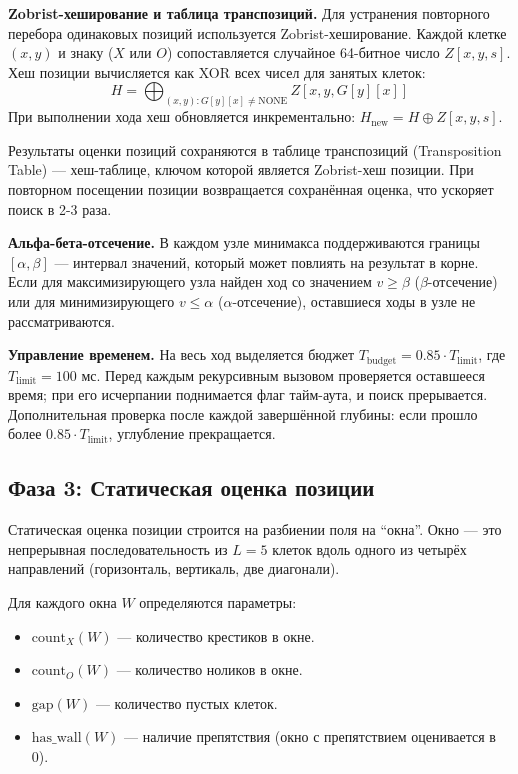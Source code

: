 \documentclass[a4paper,14pt]{extreport}
\begin{document}
\textbf{Zobrist-хеширование и таблица транспозиций.} Для устранения повторного перебора одинаковых позиций используется Zobrist-хеширование. Каждой клетке $(x, y)$ и знаку ($X$ или $O$) сопоставляется случайное 64-битное число $Z[x, y, s]$. Хеш позиции вычисляется как XOR всех чисел для занятых клеток:
\[
H = \bigoplus_{(x,y): G[y][x] \neq \text{NONE}} Z[x, y, G[y][x]]
\]
При выполнении хода хеш обновляется инкрементально: $H_{\text{new}} = H \oplus Z[x, y, s]$.

Результаты оценки позиций сохраняются в таблице транспозиций (Transposition Table) — хеш-таблице, ключом которой является Zobrist-хеш позиции. При повторном посещении позиции возвращается сохранённая оценка, что ускоряет поиск в 2-3 раза.

\textbf{Альфа-бета-отсечение.} В каждом узле минимакса поддерживаются границы $[\alpha, \beta]$ — интервал значений, который может повлиять на результат в корне. Если для максимизирующего узла найден ход со значением $v \ge \beta$ ($\beta$-отсечение) или для минимизирующего $v \le \alpha$ ($\alpha$-отсечение), оставшиеся ходы в узле не рассматриваются.

\textbf{Управление временем.} На весь ход выделяется бюджет $T_{\text{budget}} = 0.85 \cdot T_{\text{limit}}$, где $T_{\text{limit}} = 100$ мс. Перед каждым рекурсивным вызовом проверяется оставшееся время; при его исчерпании поднимается флаг тайм-аута, и поиск прерывается. Дополнительная проверка после каждой завершённой глубины: если прошло более $0.85 \cdot T_{\text{limit}}$, углубление прекращается.

\subsection{Фаза 3: Статическая оценка позиции}
Статическая оценка позиции строится на разбиении поля на ``окна''. Окно — это непрерывная последовательность из $L=5$ клеток вдоль одного из четырёх направлений (горизонталь, вертикаль, две диагонали).

Для каждого окна $W$ определяются параметры:
\begin{itemize}
    \item $\text{count}_X(W)$ — количество крестиков в окне.
    \item $\text{count}_O(W)$ — количество ноликов в окне.
    \item $\text{gap}(W)$ — количество пустых клеток.
    \item $\text{has\_wall}(W)$ — наличие препятствия (окно с препятствием оценивается в 0).
\end{itemize}
\end{document}
